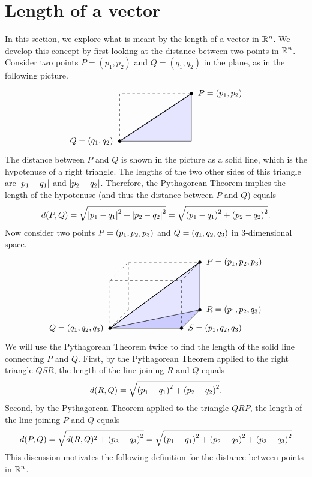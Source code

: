 \section{Length of a vector}

In this section, we explore what is meant by the length of a vector in
$\mathbb{R}^n$.  We develop this concept by first looking at the distance
between two points in $\mathbb{R}^n$. Consider two points $P=(p_1,p_2)$ and
$Q=(q_1,q_2)$ in the plane, as in the following picture.
\[
  \begin{tikzpicture}[scale=1]
    \draw[dashed] (0,0) -- (0,2) -- (3,2);
    \draw[fill=blue!10] (0,0) -- (3,0) -- (3,2) -- cycle;
    \draw[thick] (0,0) -- (3,2);
    \draw[fill](0,0) circle [radius=1.8pt] node[left=1ex]{$Q=(q_1,q_2)$};
    \draw[fill](3,2) circle [radius=1.8pt] node[right=1ex]{$P=(p_1,p_2)$};
  \end{tikzpicture}
\]
The distance between $P$ and $Q$ is shown in the picture as a solid
line, which is the hypotenuse of a right triangle.  The lengths of the
two other sides of this triangle are $\left|p_{1}-q_{1}\right| $ and
$\left|p_{2}-q_{2}\right|$. Therefore, the Pythagorean Theorem implies the
length of the hypotenuse (and thus the distance between $P$ and $Q$)
equals
\begin{equation*}
  d(P,Q)
  =\sqrt{\left|p_{1}-q_{1}\right|^{2}+\left|p_{2}-q_{2}\right|^{2}}
  =\sqrt{\left(p_{1}-q_{1}\right)^{2}+\left(p_{2}-q_{2}\right)^{2}}.
\end{equation*}
Now consider two points $P=\left(p_{1},p_{2},p_{3}\right)$ and
$Q = \left(q_{1},q_{2},q_{3}\right)$ in 3-dimensional space.
\[
  \begin{tikzpicture}[scale=1]
    \draw[dashed] (3,0,-2) -- (0,0,-2) -- (0,0,0);
    \draw[dashed] (0,0,0) -- (0,2,0);
    \draw[dashed] (0,0,-2) -- (0,2,-2);
    \draw[fill=blue!20] (0,0,0) -- (3,0,0) -- (3,0,-2) -- cycle;
    \draw[fill=blue!10] (0,0,0) -- (3,0,-2) -- (3,2,-2) -- cycle;
    \draw[dashed] (0,2,0) -- (3,2,0) -- (3,2,-2) -- (0,2,-2) -- cycle;
    \draw[dashed] (3,0,0) -- (3,2,0);
    \draw[thick] (0,0,0) -- (3,2,-2);
    \draw[fill](0,0,0) circle [radius=1.8pt] node[left=1ex]{$Q=(q_1,q_2,q_3)$};
    \draw[fill](3,2,-2) circle [radius=1.8pt] node[right=1ex]{$P=(p_1,p_2,p_3)$};
    \draw[fill](3,0,-2) circle [radius=1.8pt] node[right=1ex]{$R=(p_1,p_2,q_3)$};
    \draw[fill](3,0,0) circle [radius=1.8pt] node[right=1ex]{$S=(p_1,q_2,q_3)$};
  \end{tikzpicture}
\]
We will use the Pythagorean Theorem twice to find the length of the
solid line connecting $P$ and $Q$. First, by the Pythagorean Theorem
applied to the right triangle $QSR$, the length of the line joining
$R$ and $Q$ equals
\begin{equation*}
d(R,Q) = \sqrt{ \left(p_{1}-q_{1}\right) ^{2}+\left(p_{2}-q_{2}\right) ^{2}}.
\end{equation*}
Second, by the Pythagorean Theorem applied to the triangle $QRP$, the
length of the line joining $P$ and $Q$ equals
\begin{equation*}
d(P,Q)=\sqrt{d(R,Q)^{2}+\left(p_{3}-q_{3}\right)^{2}}
 =\sqrt{ \left(p_{1}-q_{1}\right)^{2}+\left(p_{2}-q_{2}\right)^{2}+\left(p_{3}-q_{3}\right)^{2}}
\end{equation*}
This discussion motivates the following definition for the distance
between points in $\mathbb{R}^n$.

